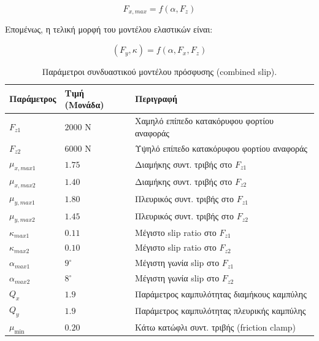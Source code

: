 \begin{equation}
    F_{x,max} = f(\alpha, F_z)
    \label{eq:maxLongitudinalForce}
\end{equation}

\noindent
Επομένως, η τελική μορφή του μοντέλου ελαστικών είναι:

\begin{equation}
    (F_y,\kappa)= f(\alpha,F_x, F_z)
    \label{eq:tyreModelFinal}
\end{equation}

\begin{table}[htbp]
    \centering
    \small
    \renewcommand{\arraystretch}{1.2}
    \begin{tabular}{@{}l l l@{}}
        \toprule
        \textbf{Παράμετρος} & \textbf{Τιμή (Μονάδα)} & \textbf{Περιγραφή} \\
        \midrule
        $F_{z1}$     & $2000$ N   & Χαμηλό επίπεδο κατακόρυφου φορτίου αναφοράς \\
        $F_{z2}$     & $6000$ N   & Υψηλό επίπεδο κατακόρυφου φορτίου αναφοράς \\
        $\mu_{x,max1}$ & $1.75$     & Διαμήκης συντ. τριβής στο $F_{z1}$ \\
        $\mu_{x,max2}$ & $1.40$     & Διαμήκης συντ. τριβής στο $F_{z2}$ \\
        $\mu_{y,max1}$ & $1.80$     & Πλευρικός συντ. τριβής στο $F_{z1}$ \\
        $\mu_{y,max2}$ & $1.45$     & Πλευρικός συντ. τριβής στο $F_{z2}$ \\
        $\kappa_{max1}$ & $0.11$     & Μέγιστο slip ratio στο $F_{z1}$ \\
        $\kappa_{max2}$ & $0.10$     & Μέγιστο slip ratio στο $F_{z2}$ \\
        $\alpha_{max1}$ & $9^\circ$  & Μέγιστη γωνία slip στο $F_{z1}$ \\
        $\alpha_{max2}$ & $8^\circ$  & Μέγιστη γωνία slip στο $F_{z2}$ \\
        $Q_x$        & $1.9$      & Παράμετρος καμπυλότητας διαμήκους καμπύλης \\
        $Q_y$        & $1.9$      & Παράμετρος καμπυλότητας πλευρικής καμπύλης \\
        $\mu_{\min}$ & $0.20$     & Κάτω κατώφλι συντ. τριβής (friction clamp) \\
        \bottomrule
    \end{tabular}
    \caption{Παράμετροι συνδυαστικού μοντέλου πρόσφυσης (combined slip).}
    \label{tab:params_combined}
\end{table}

